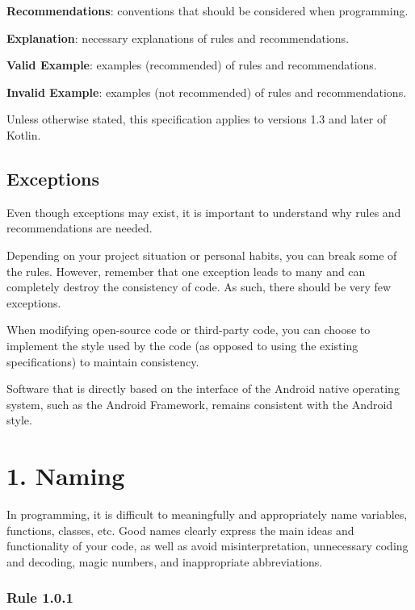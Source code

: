 \textbf{Recommendations}: conventions that should be considered when programming.



\textbf{Explanation}: necessary explanations of rules and recommendations.



\textbf{Valid Example}: examples (recommended) of rules and recommendations.



\textbf{Invalid Example}: examples (not recommended) of rules and recommendations.



Unless otherwise stated, this specification applies to versions 1.3 and later of Kotlin.



\subsection*{\textbf{Exceptions}}



Even though exceptions may exist, it is important to understand why rules and recommendations are needed.

Depending on your project situation or personal habits, you can break some of the rules. However, remember that one exception leads to many and can completely destroy the consistency of code. As such, there should be very few exceptions.

When modifying open-source code or third-party code, you can choose to implement the style used by the code (as opposed to using the existing specifications) to maintain consistency.

Software that is directly based on the interface of the Android native operating system, such as the Android Framework, remains consistent with the Android style.

\section*{\textbf{1. Naming}}

In programming, it is difficult to meaningfully and appropriately name variables, functions, classes, etc. Good names clearly express the main ideas and functionality of your code, as well as avoid misinterpretation, unnecessary coding and decoding, magic numbers, and inappropriate abbreviations.



\subsubsection*{\textbf{Rule 1.0.1}}
\leavevmode\newline

